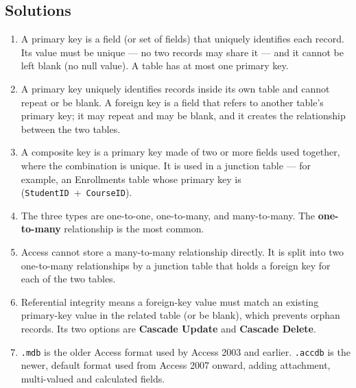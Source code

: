 \documentclass[11pt]{article}
\begin{document}
\subsection*{Solutions}
\begingroup\small
\begin{enumerate}[label=\arabic*.]
  \item A primary key is a field (or set of fields) that uniquely identifies
    each record. Its value must be unique --- no two records may share it ---
    and it cannot be left blank (no null value). A table has at most one
    primary key.
  \item A primary key uniquely identifies records inside its own table and
    cannot repeat or be blank. A foreign key is a field that refers to another
    table's primary key; it may repeat and may be blank, and it creates the
    relationship between the two tables.
  \item A composite key is a primary key made of two or more fields used
    together, where the combination is unique. It is used in a junction table
    --- for example, an Enrollments table whose primary key is
    (\texttt{StudentID}~+~\texttt{CourseID}).
  \item The three types are one-to-one, one-to-many, and many-to-many. The
    \textbf{one-to-many} relationship is the most common.
  \item Access cannot store a many-to-many relationship directly. It is split
    into two one-to-many relationships by a junction table that holds a
    foreign key for each of the two tables.
  \item Referential integrity means a foreign-key value must match an existing
    primary-key value in the related table (or be blank), which prevents
    orphan records. Its two options are \textbf{Cascade Update} and
    \textbf{Cascade Delete}.
  \item \texttt{.mdb} is the older Access format used by Access 2003 and
    earlier. \texttt{.accdb} is the newer, default format used from Access
    2007 onward, adding attachment, multi-valued and calculated fields.
\end{enumerate}
\endgroup
\end{document}
